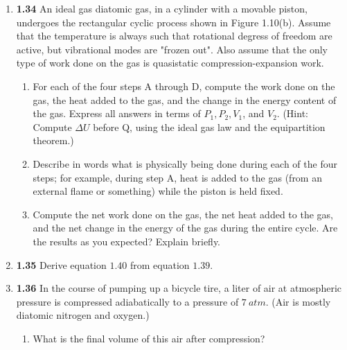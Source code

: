 \documentclass[fleqn]{article}
\begin{document}
\begin{enumerate}
    \item \textbf{1.34} An ideal gas diatomic gas, in a cylinder with a movable piston, undergoes the rectangular cyclic process
    shown in Figure 1.10(b). Assume that the temperature is always such that rotational degress of freedom are active, but vibrational
    modes are "frozen out". Also assume that the only type of work done on the gas is quasistatic compression-expansion work.
    \begin{enumerate}
      \item For each of the four steps A through D, compute the work done on the gas, the heat added to the gas, and the change in the energy
      content of the gas. Express all answers in terms of $P_1, P_2, V_1$, and $V_2$. (Hint: Compute $\Delta U$ before Q, using
      the ideal gas law and the equipartition theorem.)


      \item Describe in words what is physically being done during each of the four steps; for example, during step A, heat is added to the 
      gas (from an external flame or something) while the piston is held fixed.
    

      \item Compute the net work done on the gas, the net heat added to the gas, and the net change in the energy of the gas during the entire
      cycle. Are the results as you expected? Explain briefly.


    \end{enumerate}


    \item \textbf{1.35} Derive equation $1.40$ from equation $1.39$.
  

    \item \textbf{1.36} In the course of pumping up a bicycle tire, a liter of air at atmospheric pressure is compressed adiabatically 
    to a pressure of $7 ~ atm$. (Air is mostly diatomic nitrogen and oxygen.)
    \begin{enumerate}
      \item What is the final volume of this air after compression?


\end{enumerate}
\end{enumerate}
\end{document}
